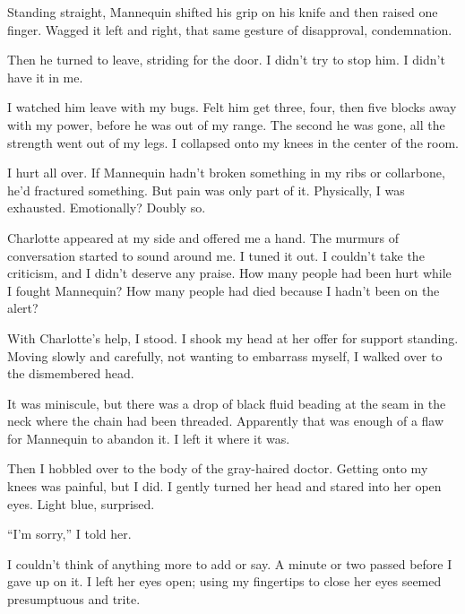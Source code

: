 Standing straight, Mannequin shifted his grip on his knife and then raised one finger.  Wagged it left and right, that same gesture of disapproval, condemnation.



Then he turned to leave, striding for the door.  I didn't try to stop him.  I didn't have it in me.



I watched him leave with my bugs.  Felt him get three, four, then five blocks away with my power, before he was out of my range.  The second he was gone, all the strength went out of my legs.  I collapsed onto my knees in the center of the room.



I hurt all over.  If Mannequin hadn't broken something in my ribs or collarbone, he'd fractured something.  But pain was only part of it.  Physically, I was exhausted.  Emotionally?  Doubly so.



Charlotte appeared at my side and offered me a hand.  The murmurs of conversation started to sound around me.  I tuned it out.  I couldn't take the criticism, and I didn't deserve any praise.  How many people had been hurt while I fought Mannequin?  How many people had died because I hadn't been on the alert?



With Charlotte's help, I stood.  I shook my head at her offer for support standing.  Moving slowly and carefully, not wanting to embarrass myself, I walked over to the dismembered head.



It was miniscule, but there was a drop of black fluid beading at the seam in the neck where the chain had been threaded.  Apparently that was enough of a flaw for Mannequin to abandon it.  I left it where it was.



Then I hobbled over to the body of the gray-haired doctor.  Getting onto my knees was painful, but I did.  I gently turned her head and stared into her open eyes.  Light blue, surprised.



``I'm sorry,'' I told her.



I couldn't think of anything more to add or say.  A minute or two passed before I gave up on it.  I left her eyes open; using my fingertips to close her eyes seemed presumptuous and trite.



